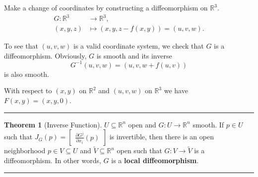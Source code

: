 \documentclass[12pt]{article}
\newcommand{\keyword}[1]{\textbf{#1}}
\newcommand{\sepline}{\rule{\textwidth}{0.4pt}}
\theoremstyle{definition}
\newtheorem{theorem}{Theorem}
\newcommand{\R}{\mathbb{R}}
\newcommand{\<}{\left\langle}
\renewcommand{\>}{\right\rangle}
\newcommand{\seq}{\subseteq}
\newcommand{\To}{\longrightarrow}
\newcommand{\Mapsto}{\longmapsto}
\newcommand{\pdv}[2]{\frac{\partial #1}{\partial #2}}
\newcommand{\mat}[1]{\begin{bmatrix}#1\end{bmatrix}}
\renewcommand{\tilde}{\widetilde}
\begin{document}
Make a change of coordinates by constructing a diffeomorphism on $\R^3$.
\begin{align*}
    G : \R^3 &\To \R^3, \\
        (x, y, z) &\Mapsto (x, y, z - f(x, y)) = (u, v, w).
\end{align*}

To see that $(u, v, w)$ is a valid coordinate system, we check that $G$ is a diffeomorphism.
Obviously, $G$ is smooth and its inverse
\[
    G^{-1}(u, v, w) = (u, v, w + f(u, v))
\]
is also smooth.

With respect to $(x, y)$ on $\R^2$ and $(u, v, w)$ on $\R^3$ we have $F(x, y) = (x, y, 0)$.

\sepline

\begin{theorem}[Inverse Function]
    $U \seq \R^n$ open and $G : U \to \R^n$ smooth.
    If $p \in U$ such that $J_G(p) = \mat{\pdv{G^j}{x_i}(p)}$ is invertible, then there is an open neighborhood $p \in V \seq U$ and $\tilde{V} \seq \R^n$ open such that $G : V \to \tilde{V}$ is a diffeomorphism.
    In other words, $G$ is a \keyword{local diffeomorphism}.
\end{theorem}


\sepline
\end{document}
